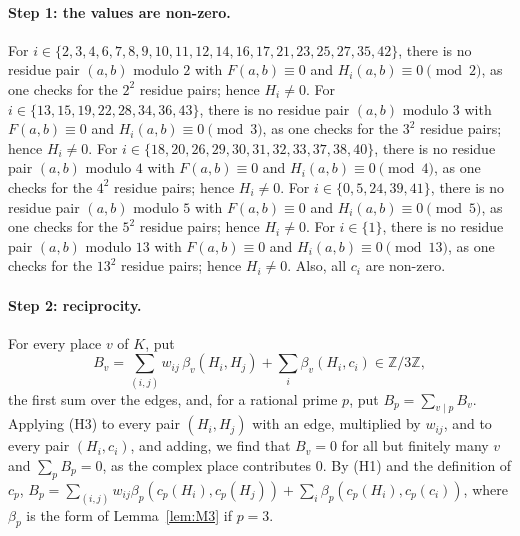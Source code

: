 \documentclass[11pt]{article}
\newcommand{\Z}{\mathbb{Z}}
\begin{document}
\paragraph{Step 1: the values are non-zero.} For $i\in\{2,\allowbreak 3,\allowbreak 4,\allowbreak 6,\allowbreak 7,\allowbreak 8,\allowbreak 9,\allowbreak 10,\allowbreak 11,\allowbreak 12,\allowbreak 14,\allowbreak 16,\allowbreak 17,\allowbreak 21,\allowbreak 23,\allowbreak 25,\allowbreak 27,\allowbreak 35,\allowbreak 42\}$, there is no residue pair $(a,b)$ modulo $2$ with $F(a,b)\equiv0$ and $H_i(a,b)\equiv0\pmod{2}$, as one checks for the $2^2$ residue pairs; hence $H_i\neq0$. For $i\in\{13,\allowbreak 15,\allowbreak 19,\allowbreak 22,\allowbreak 28,\allowbreak 34,\allowbreak 36,\allowbreak 43\}$, there is no residue pair $(a,b)$ modulo $3$ with $F(a,b)\equiv0$ and $H_i(a,b)\equiv0\pmod{3}$, as one checks for the $3^2$ residue pairs; hence $H_i\neq0$. For $i\in\{18,\allowbreak 20,\allowbreak 26,\allowbreak 29,\allowbreak 30,\allowbreak 31,\allowbreak 32,\allowbreak 33,\allowbreak 37,\allowbreak 38,\allowbreak 40\}$, there is no residue pair $(a,b)$ modulo $4$ with $F(a,b)\equiv0$ and $H_i(a,b)\equiv0\pmod{4}$, as one checks for the $4^2$ residue pairs; hence $H_i\neq0$. For $i\in\{0,\allowbreak 5,\allowbreak 24,\allowbreak 39,\allowbreak 41\}$, there is no residue pair $(a,b)$ modulo $5$ with $F(a,b)\equiv0$ and $H_i(a,b)\equiv0\pmod{5}$, as one checks for the $5^2$ residue pairs; hence $H_i\neq0$. For $i\in\{1\}$, there is no residue pair $(a,b)$ modulo $13$ with $F(a,b)\equiv0$ and $H_i(a,b)\equiv0\pmod{13}$, as one checks for the $13^2$ residue pairs; hence $H_i\neq0$. Also, all $c_i$ are non-zero.

\paragraph{Step 2: reciprocity.} For every place $v$ of $K$, put
\begin{equation}\label{eq:B}
B_v=\sum_{(i,j)}w_{ij}\,\beta_v(H_i,H_j)+\sum_i\beta_v(H_i,c_i)\in\Z/3\Z,
\end{equation}
the first sum over the edges, and, for a rational prime $p$, put $B_p=\sum_{v\mid p}B_v$. Applying (H3) to every pair $(H_i,H_j)$ with an edge, multiplied by $w_{ij}$, and to every pair $(H_i,c_i)$, and adding, we find that $B_v=0$ for all but finitely many $v$ and $\sum_pB_p=0$, as the complex place contributes $0$. By (H1) and the definition of $c_p$, $B_p=\sum_{(i,j)}w_{ij}\beta_p(c_p(H_i),c_p(H_j))+\sum_i\beta_p(c_p(H_i),c_p(c_i))$, where $\beta_p$ is the form of Lemma~\ref{lem:M3} if $p=3$.
\end{document}
